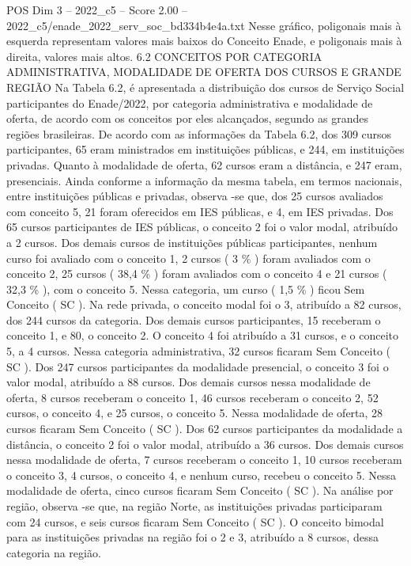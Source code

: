 \begin{textsample}{POS Dim 3 – 2022\_c5 – Score 2.00 – 2022\_c5/enade\_2022\_serv\_soc\_bd334b4e4a.txt}
Nesse gráfico, poligonais mais à esquerda representam valores mais baixos do Conceito Enade, e poligonais mais à direita, valores mais altos. 6.2 CONCEITOS POR CATEGORIA ADMINISTRATIVA, MODALIDADE DE OFERTA DOS CURSOS E GRANDE REGIÃO Na Tabela 6.2, é apresentada a distribuição dos cursos de Serviço Social participantes do Enade/2022, por categoria administrativa e modalidade de oferta, de acordo com os conceitos por eles alcançados, segundo as grandes regiões brasileiras.
De acordo com as informações da Tabela 6.2, dos 309 cursos participantes, 65 eram ministrados em instituições públicas, e 244, em instituições privadas.
Quanto à modalidade de oferta, 62 cursos eram a distância, e 247 eram, presenciais.
Ainda conforme a informação da mesma tabela, em termos nacionais, entre instituições públicas e privadas, observa -se que, dos 25 cursos avaliados com conceito 5, 21 foram oferecidos em IES públicas, e 4, em IES privadas.
Dos 65 cursos participantes de IES públicas, o conceito 2 foi o valor modal, atribuído a 2 cursos.
Dos demais cursos de instituições públicas participantes, nenhum curso foi avaliado com o conceito 1, 2 cursos ( 3 \% ) foram avaliados com o conceito 2, 25 cursos ( 38,4 \% ) foram avaliados com o conceito 4 e 21 cursos ( 32,3 \% ), com o conceito 5.
Nessa categoria, um curso ( 1,5 \% ) ficou Sem Conceito ( SC ).
Na rede privada, o conceito modal foi o 3, atribuído a 82 cursos, dos 244 cursos da categoria.
Dos demais cursos participantes, 15 receberam o conceito 1, e 80, o conceito 2.
O conceito 4 foi atribuído a 31 cursos, e o conceito 5, a 4 cursos.
Nessa categoria administrativa, 32 cursos ficaram Sem Conceito ( SC ).
Dos 247 cursos participantes da modalidade presencial, o conceito 3 foi o valor modal, atribuído a 88 cursos.
Dos demais cursos nessa modalidade de oferta, 8 cursos receberam o conceito 1, 46 cursos receberam o conceito 2, 52 cursos, o conceito 4, e 25 cursos, o conceito 5.
Nessa modalidade de oferta, 28 cursos ficaram Sem Conceito ( SC ).
Dos 62 cursos participantes da modalidade a distância, o conceito 2 foi o valor modal, atribuído a 36 cursos.
Dos demais cursos nessa modalidade de oferta, 7 cursos receberam o conceito 1, 10 cursos receberam o conceito 3, 4 cursos, o conceito 4, e nenhum curso, recebeu o conceito 5.
Nessa modalidade de oferta, cinco cursos ficaram Sem Conceito ( SC ).
Na análise por região, observa -se que, na região Norte, as instituições privadas participaram com 24 cursos, e seis cursos ficaram Sem Conceito ( SC ).
O conceito bimodal para as instituições privadas na região foi o 2 e 3, atribuído a 8 cursos, dessa categoria na região.

\end{textsample}

